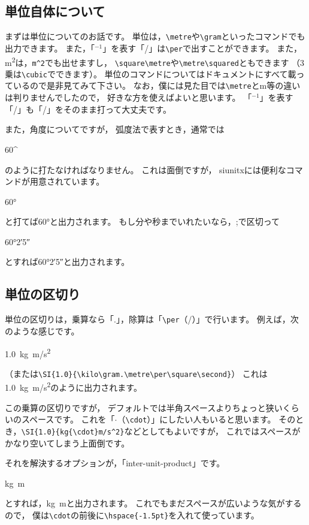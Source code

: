 \subsection{単位自体について}
まずは単位についてのお話です。
単位は，\verb|\metre|や\verb|\gram|といったコマンドでも出力できます。
また，「${}^{-1}$」を表す「/」は\verb|\per|で出すことができます。
また，\si{\square\metre}は，\verb|m^2|でも出せますし，
\verb|\square\metre|や\verb|\metre\squared|ともできます
（3乗は\verb|\cubic|でできます）。
単位のコマンドについてはドキュメントにすべて載っているので是非見てみて下さい。
なお，僕には見た目では\verb|\metre|とm等の違いは判りませんでしたので，
好きな方を使えばよいと思います。
「${}^{-1}$」を表す「/」も「/」をそのまま打って大丈夫です。

また，角度についてですが，
弧度法で表すとき，通常では
\begin{ITeX}
60^{\circ}
\end{ITeX}
のように打たなければなりません。
これは面倒ですが，
siunitxには便利なコマンドが用意されています。
\begin{ITeX}
\ang{60}
\end{ITeX}
と打てば\ang{60}と出力されます。
もし分や秒までいれたいなら，;で区切って
\begin{ITeX}
\ang{60;2;5}
\end{ITeX}
とすれば\ang{60;2;5}と出力されます。


\subsection{単位の区切り}
単位の区切りは，乗算なら「.」，除算は「\verb|\per|（/）」で行います。
例えば，次のような感じです。
\begin{ITeX}
\SI{1.0}{kg.m/s^2}
\end{ITeX}
（または\verb|\SI{1.0}{\kilo\gram.\metre\per\square\second}|）
これは\SI{1.0}{kg.m/s^2}のように出力されます。

この乗算の区切りですが，
デフォルトでは半角スペースよりちょっと狭いくらいのスペースです。
これを「$\cdot$（\verb|\cdot|）」にしたい人もいると思います。
そのとき，\verb|\SI{1.0}{kg{\cdot}m/s^2}|などとしてもよいですが，
これではスペースがかなり空いてしまう上面倒です。

それを解決するオプションが，「inter-unit-product」です。
\begin{ITeX}
\si[inter-unit-product = \ensuremath{\cdot}]{kg.m}
\end{ITeX}
とすれば，\si[inter-unit-product = \ensuremath{\cdot}]{kg.m}と出力されます。
これでもまだスペースが広いような気がするので，
僕は\verb|\cdot|の前後に\verb|\hspace{-1.5pt}|を入れて使っています。

